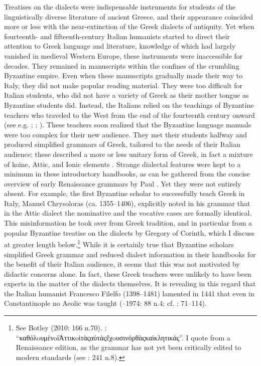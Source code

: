 Treatises on the dialects were indispensable instruments for students of the linguistically diverse literature of ancient Greece, and their appearance coincided more or less with the near-extinction of the Greek dialects of antiquity. Yet when fourteenth- and fifteenth-century Italian humanists started to direct their attention to Greek language and literature, knowledge of which had largely vanished in medieval Western Europe, these instruments were inaccessible for decades. They remained in manuscripts within the confines of the crumbling Byzantine empire. Even when these manuscripts gradually made their way to Italy, they did not make popular reading material. They were too difficult for Italian students, who did not have a variety of Greek as their mother tongue as Byzantine students did. Instead, the Italians relied on the teachings of Byzantine teachers who traveled to the West from the end of the fourteenth century onward (see e.g. \citealt{Harris1995}; \citealt{Botley2010}; \citealt{Wilson2016}). These teachers soon realized that the Byzantine language manuals were too complex for their new audience. They met their students halfway and produced simplified grammars of Greek, tailored to the needs of their Italian audience; these described a more or less unitary form of Greek, in fact a mixture of koine, Attic, and Ionic elements \citep[123]{Ciccolella2008}. Strange dialectal features were kept to a minimum in these introductory handbooks, as can be gathered from the concise overview of early Renaissance grammars by Paul \citet{Botley2010}. Yet they were not entirely absent. For example, the first Byzantine scholar to successfully teach Greek in Italy, Manuel Chrysoloras (ca. 1355–1406), explicitly noted in his grammar that in the Attic dialect the nominative and the vocative cases are formally identical. This misinformation he took over from Greek tradition, and in particular from a popular Byzantine treatise on the dialects by Gregory of Corinth, which I discuss at greater length below.\footnote{See Botley (2010: 166 n.70). \citet[20]{Chrysoloras1512}: “καθόλoυμὲνoἱἈττικoὶτὰςαὐτὰςἔχoυσινὀρθὰςκαὶκλητικάς”. I quote from a Renaissance edition, as the grammar has not yet been critically edited to modern standards (see \citealt{Nuti2013}: 241 n.8).} While it is certainly true that Byzantine scholars simplified Greek grammar and reduced dialect information in their handbooks for the benefit of their Italian audience, it seems that this was not motivated by didactic concerns alone. In fact, these Greek teachers were unlikely to have been experts in the matter of the dialects themselves. It is revealing in this regard that the Italian humanist Francesco Filelfo (1398–1481) lamented in 1441 that even in Constantinople no Aeolic was taught (\citealt{Rotolo1973}–1974: 88 n.4; cf. \citealt{Botley2010}: 71–114).

